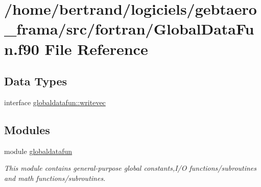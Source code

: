 \hypertarget{_global_data_fun_8f90}{}\section{/home/bertrand/logiciels/gebtaero\+\_\+frama/src/fortran/\+Global\+Data\+Fun.f90 File Reference}
\label{_global_data_fun_8f90}
\subsection*{Data Types}
\begin{DoxyCompactItemize}
\item 
interface \hyperlink{interfaceglobaldatafun_1_1writevec}{globaldatafun\+::writevec}
\end{DoxyCompactItemize}
\subsection*{Modules}
\begin{DoxyCompactItemize}
\item 
module \hyperlink{namespaceglobaldatafun}{globaldatafun}
\begin{DoxyCompactList}\small\item\em This module contains general-\/purpose global constants,I/O functions/subroutines and math functions/subroutines. \end{DoxyCompactList}\end{DoxyCompactItemize}

